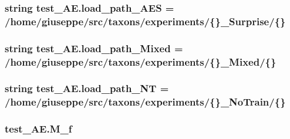 \subsubsection[{\texorpdfstring{load\+\_\+path\+\_\+\+A\+ES}{load_path_AES}}]{\setlength{\rightskip}{0pt plus 5cm}string test\+\_\+\+A\+E.\+load\+\_\+path\+\_\+\+A\+ES = \textquotesingle{}/home/giuseppe/src/taxons/experiments/\{\}\+\_\+\+Surprise/\{\}\textquotesingle{}}\hypertarget{namespacetest___a_e_a70bfb3a602b04e4fb27b72ba9812a747}{}\label{namespacetest___a_e_a70bfb3a602b04e4fb27b72ba9812a747}
\subsubsection[{\texorpdfstring{load\+\_\+path\+\_\+\+Mixed}{load_path_Mixed}}]{\setlength{\rightskip}{0pt plus 5cm}string test\+\_\+\+A\+E.\+load\+\_\+path\+\_\+\+Mixed = \textquotesingle{}/home/giuseppe/src/taxons/experiments/\{\}\+\_\+\+Mixed/\{\}\textquotesingle{}}\hypertarget{namespacetest___a_e_ac24fbeab7bd192f061b5ad37746b7c49}{}\label{namespacetest___a_e_ac24fbeab7bd192f061b5ad37746b7c49}
\subsubsection[{\texorpdfstring{load\+\_\+path\+\_\+\+NT}{load_path_NT}}]{\setlength{\rightskip}{0pt plus 5cm}string test\+\_\+\+A\+E.\+load\+\_\+path\+\_\+\+NT = \textquotesingle{}/home/giuseppe/src/taxons/experiments/\{\}\+\_\+\+No\+Train/\{\}\textquotesingle{}}\hypertarget{namespacetest___a_e_a5ab7406072c5b846aedbb57d687ef841}{}\label{namespacetest___a_e_a5ab7406072c5b846aedbb57d687ef841}
\subsubsection[{\texorpdfstring{M\+\_\+f}{M_f}}]{\setlength{\rightskip}{0pt plus 5cm}test\+\_\+\+A\+E.\+M\+\_\+f}\hypertarget{namespacetest___a_e_adf81b38c214c12b62a1137d8cd595d27}{}\label{namespacetest___a_e_adf81b38c214c12b62a1137d8cd595d27}
